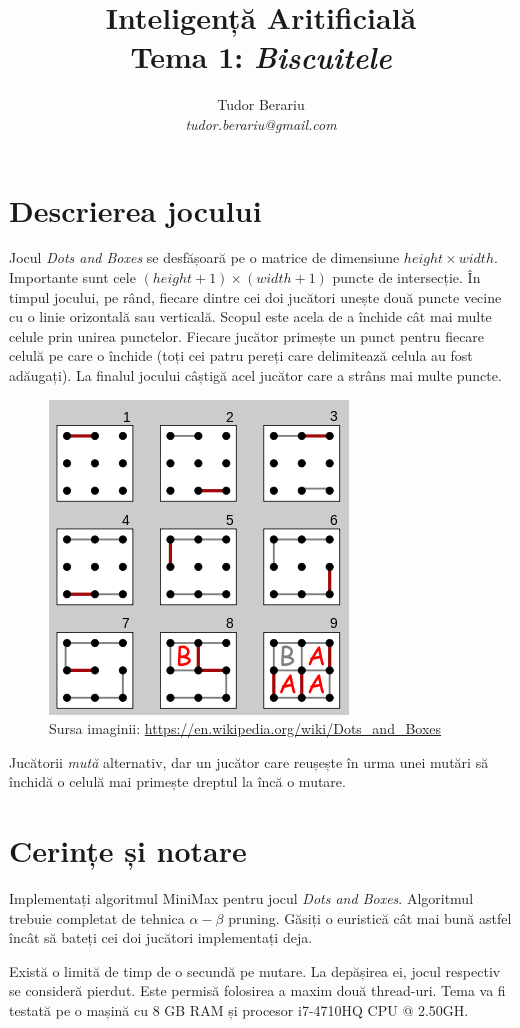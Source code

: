 \documentclass[12pt]{article}
\title{Inteligență Aritificială \\ Tema 1: \emph{Biscuitele}}
\author{Tudor Berariu \\ \emph{tudor.berariu@gmail.com}}
\begin{document}
\maketitle

\section{Descrierea jocului}
\label{sec:desc}

Jocul \emph{Dots and Boxes} se desfășoară pe o matrice de dimensiune
$height \times width$. Importante sunt cele $(height+1) \times
(width+1)$ puncte de intersecție. În timpul jocului, pe rând, fiecare
dintre cei doi jucători unește două puncte vecine cu o linie
orizontală sau verticală. Scopul este acela de a închide cât mai multe
celule prin unirea punctelor. Fiecare jucător primește un punct pentru
fiecare celulă pe care o închide (toți cei patru pereți care
delimitează celula au fost adăugați). La finalul jocului câștigă acel
jucător care a strâns mai multe puncte.

\begin{figure}[h]
  \centering
  \includegraphics[width=.3\textwidth]{dots.png}
  \caption{Sursa imaginii: \url{https://en.wikipedia.org/wiki/Dots_and_Boxes}}
\end{figure}

Jucătorii \emph{mută} alternativ, dar un jucător care reușește în urma
unei mutări să închidă o celulă mai primește dreptul la încă o mutare.

\section{Cerințe și notare}
\label{sec:tasks}

Implementați algoritmul MiniMax pentru jocul \emph{Dots and
  Boxes}. Algoritmul trebuie completat de tehnica $\alpha-\beta$
pruning. Găsiți o euristică cât mai bună astfel încât să bateți cei
doi jucători implementați deja.

Există o limită de timp de o secundă pe mutare. La depășirea ei, jocul
respectiv se consideră pierdut. Este permisă folosirea a maxim două
thread-uri. Tema va fi testată pe o mașină cu 8 GB RAM și procesor
i7-4710HQ CPU @ 2.50GH.
\end{document}
